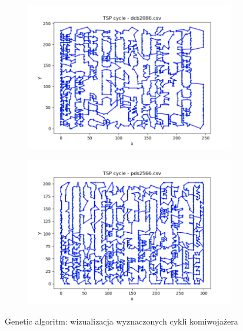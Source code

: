 \documentclass[12pt]{article}
\begin{document}
\begin{figure}[htpb]
\begin{subfigure}[b]{0.475\textwidth}
            \end{subfigure}
            \hfill
            \begin{subfigure}[b]{0.475\textwidth}
                \includegraphics[width=\linewidth]{img/dcb2086.png}
            \end{subfigure}
            \begin{subfigure}[b]{0.475\textwidth}
                \includegraphics[width=\linewidth]{img/pds2566.png}
            \end{subfigure}
            \caption{Genetic algoritm: wizualizacja wyznaczonych cykli komiwojażera}
        \end{figure}
\end{document}
